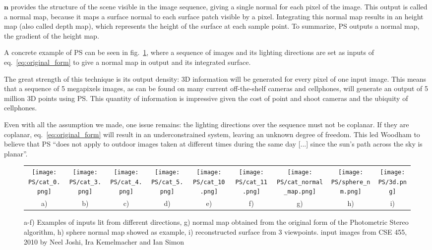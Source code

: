 $\mathbf{n}$ provides the structure of the scene visible in the image sequence, giving a single normal for each pixel of the image. This output is called a normal map, because it maps a surface normal to each surface patch visible by a pixel. Integrating this normal map results in an height map (also called depth map), which represents the height of the surface at each sample point. To summarize, PS outputs a normal map, the gradient of the height map.

A concrete example of PS can be seen in fig.~\ref{fig:PS_example}, where a sequence of images and its lighting directions are set as inputs of eq.~\eqref{eq:original_form} to give a normal map in output and its integrated surface.

The great strength of this technique is its output density: 3D information will be generated for every pixel of one input image. This means that a sequence of 5 megapixels images, as can be found on many current off-the-shelf cameras and cellphones, will generate an output of 5 million 3D points using PS. This quantity of information is impressive given the cost of point and shoot cameras and the ubiquity of cellphones.

Even with all the assumption we made, one issue remains: the lighting directions over the sequence must not be coplanar. If they are coplanar, eq.~\ref{eq:original_form} will result in an underconstrained system, leaving an unknown degree of freedom. This led Woodham to believe that PS ``does not apply to outdoor images taken at different times during the same day [...] since the sun's path across the sky is planar''.


\begin{figure}
\begin{tabular}{cccccc|ccc}
\texttt{[image: PS/cat\_0.png]} &
\texttt{[image: PS/cat\_3.png]} &
\texttt{[image: PS/cat\_4.png]} &
\texttt{[image: PS/cat\_5.png]} &
\texttt{[image: PS/cat\_10.png]} &
\texttt{[image: PS/cat\_11.png]} &
\texttt{[image: PS/cat\_normal\_map.png]} &
\texttt{[image: PS/sphere\_nm.png]} &
\texttt{[image: PS/3d.png]} \\
a) & b) & c) & d) & e) & f) & g) & h) & i)
\end{tabular}
\caption{a-f) Examples of inputs lit from different directions, g) normal map obtained from the original form of the Photometric Stereo algorithm, h) sphere normal map showed as example, i) reconstructed surface from 3 viewpoints.\newline
{\small input images from CSE 455, 2010 by Neel Joshi, Ira Kemelmacher and Ian Simon}
}
\label{fig:PS_example}
\end{figure}

